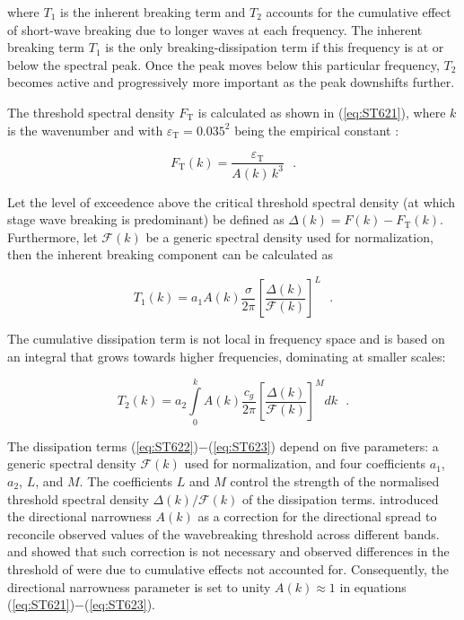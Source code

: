 \noindent
where $T_1$ is the inherent breaking term and $T_2$ accounts for the
cumulative effect of short-wave breaking due to longer waves at each
frequency. The inherent breaking term $T_1$ is the only breaking-dissipation
term if this frequency is at or below the spectral peak. Once the peak moves
below this particular frequency, $T_2$ becomes active and progressively more
important as the peak downshifts further.

The threshold spectral density $F_{\mathrm{T}}$ is calculated as shown in
(\ref{eq:ST621}), where $k$ is the wavenumber and with
$\varepsilon_{\mathrm{T}}=0.035^2$ being the empirical constant
\citep{art:Bea07}:

\begin{equation}\label{eq:ST621}
  F_{\mathrm{T}}(k)=\frac{\varepsilon_{\mathrm{T}}}{A(k)\,k^3} \:\:\: . 
\end{equation}

\noindent
Let the level of exceedence above the critical threshold spectral density (at
which stage wave breaking is predominant) be defined as
$\Delta(k)=F(k)-F_{\mathrm{T}}(k)$. Furthermore, let $\mathcal{F}(k)$ be a
generic spectral density used for normalization, then the inherent breaking
component can be calculated as

\begin{equation}\label{eq:ST622}
T_1(k)=a_1 A(k)\frac{\sigma}{2\pi} \left [ \frac{\Delta(k)}{\mathcal{F}(k)}
\right ]^L \:\:\: .
\end{equation}

\noindent
The cumulative dissipation term is not local in frequency space and is 
based on an integral that grows towards higher frequencies, dominating at 
smaller scales:

\begin{equation}\label{eq:ST623}
T_2(k)=a_2 \int\limits_0^k A(k) \frac{c_g}{2\pi} \left [
\frac{\Delta(k)}{\mathcal{F}(k)} \right ]^M\!\!dk \:\:\: .
\end{equation}

\noindent
The dissipation terms (\ref{eq:ST622})$-$(\ref{eq:ST623}) depend on five
parameters: a generic spectral density $\mathcal{F}(k)$ used for
normalization, and four coefficients $a_1$, $a_2$, $L$, and $M$.  The
coefficients $L$ and $M$ control the strength of the normalised threshold
spectral density $\Delta(k)/\mathcal{F}(k)$ of the dissipation
terms. \citet{art:BGM02} introduced the directional narrowness $A(k)$ as a
correction for the directional spread to reconcile observed values of the
wavebreaking threshold across different bands. \citet{art:Bea07} and
\citet{art:Bab09} showed that such correction is not necessary and observed
differences in the threshold of \citet{art:BGM02} were due to cumulative
effects not accounted for. Consequently, the directional narrowness parameter
is set to unity $A(k)\approx 1$ in equations
(\ref{eq:ST621})$-$(\ref{eq:ST623}).

